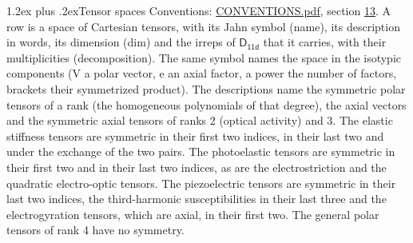 \documentclass[10pt,a4paper]{article}
\makeatletter
\renewcommand\section{\@startsection{section}{1}{\z@}{-3ex plus -1ex minus -.2ex}%
  {1.2ex plus .2ex}{\normalfont\large\sffamily\bfseries\color{parttitle}}}
\numberwithin{equation}{section}
\newcommand{\grp}[1]{\mathsf{#1}}
\makeatother
\begin{document}
\section{Tensor spaces}\label{s:tensor_spaces}
Conventions: \href{../../CONVENTIONS.pdf}{CONVENTIONS.pdf}, section \href{../../CONVENTIONS.pdf\#conv.13}{13}.
\leavevmode\label{n:head.name}\label{n:head.description}\label{n:head.dim}\label{n:head.decomposition}A row is a space of Cartesian tensors, with its Jahn symbol (name), its description in words, its dimension (dim) and the irreps of $\grp{D_{11d}}$ that it carries, with their multiplicities (decomposition). \label{n:label.jahn}The same symbol names the space in the isotypic components (V a polar vector, e an axial factor, a power the number of factors, brackets their symmetrized product). The descriptions name the symmetric polar tensors of a rank (the homogeneous polynomials of that degree), the axial vectors and the symmetric axial tensors of ranks 2 (optical activity) and 3. The elastic stiffness tensors are symmetric in their first two indices, in their last two and under the exchange of the two pairs. The photoelastic tensors are symmetric in their first two and in their last two indices, as are the electrostriction and the quadratic electro-optic tensors. The piezoelectric tensors are symmetric in their last two indices, the third-harmonic susceptibilities in their last three and the electrogyration tensors, which are axial, in their first two. The general polar tensors of rank 4 have no symmetry.
\end{document}
